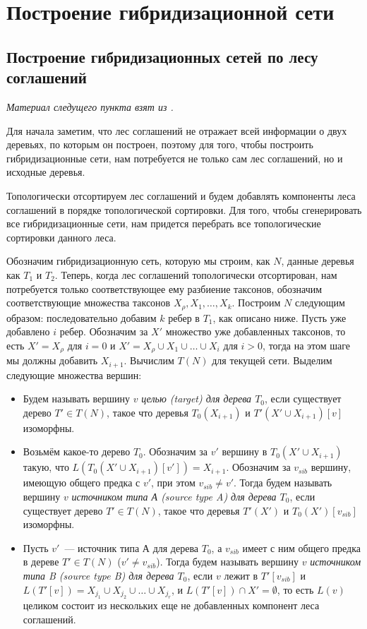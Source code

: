 \documentclass[14pt]{matmex-diploma-custom}
\begin{document}
\section{Построение гибридизационной сети}      

    \subsection{Построение гибридизационных сетей по лесу соглашений}
    
        \textit{Материал следущего пункта взят из \cite{ediss19444}.}
        
        \bigskip
        
        Для начала заметим, что лес соглашений не отражает всей информации о двух деревьях, по
        которым он построен, поэтому для того, чтобы построить гибридизационные сети, нам потребуется не только сам лес соглашений, но и исходные деревья.
        
        Топологически отсортируем лес соглашений и будем добавлять компоненты леса соглашений в порядке топологической сортировки. Для того, чтобы сгенерировать все гибридизационные сети, нам придется перебрать все топологические сортировки данного леса.
        
        Обозначим гибридизационную сеть, которую мы строим, как $N$, данные деревья как $T_1$ и $T_2$. Теперь, когда лес соглашений топологически отсортирован, нам потребуется только соответствующее ему разбиение таксонов, обозначим соответствующие множества таксонов $X_\rho, X_1, \ldots, X_k$. Построим $N$ следующим образом:
        последовательно добавим $k$ ребер в $T_1$, как описано ниже. 
        Пусть уже добавлено $i$ ребер. Обозначим за $X'$ множество уже добавленных таксонов, то есть $X'= X_\rho$ для $i = 0$ и $X'= X_\rho \cup X_1 \cup \ldots \cup X_{i}$ для $i > 0$, тогда на этом шаге мы должны добавить $X_{i + 1}$. Вычислим $T(N)$ для текущей сети. Выделим следующие множества вершин:
        \begin{itemize}
            \item Будем называть вершину $v$ \textit{целью (target) для дерева $T_0$}, если существует дерево $T' \in T(N)$, такое что деревья $T_0(X_{i +1})$ и $T'(X' \cup X_{i+1})[v]$ изоморфны.
            \item Возьмём какое-то дерево $T_0$. Обозначим за $v'$ вершину в $T_0(X' \cup X_{i+1})$ такую, что $L(T_0(X' \cup X_{i+1})[v']) = X_{i+1}$. Обозначим за $v_{sib}$ вершину, имеющую общего предка с $v'$, при этом $v_{sib} \neq v'$. Тогда будем называть вершину $v$ \textit{источником типа А (source type A) для дерева $T_0$}, если существует дерево $T' \in T(N)$, такое что деревья $T'(X')$ и $T_0(X')[v_{sib}]$ изоморфны.
            \item Пусть $v'$~--- источник типа А для дерева $T_0$, а $v_{sib}$ имеет с ним общего предка в дереве $T' \in T(N)$ ($v' \neq v_{sib}$). Тогда будем называть вершину $v$ \textit{источником типа B (source type B) для дерева $T_0$}, если $v$ лежит в $T'[v_{sib}]$ и $L(T'[v])=X_{j_1}\cup X_{j_2}\cup\ldots\cup X_{j_r}$, и $L(T'[v])\cap X'=\emptyset$, то есть $L(v)$ целиком состоит из нескольких еще не добавленных компонент леса соглашений.
        \end{itemize}
        
\end{document}
